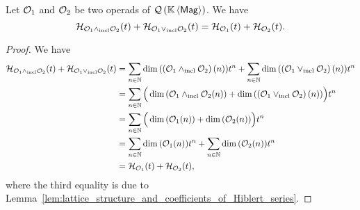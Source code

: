 \begin{Theorem}
    \label{thm:Grassmann_formula_for_Hilbert_series_of_QMag}
    Let $\mathcal{O}_1$ and $\mathcal{O}_2$ be two operads of $\mathcal{Q}\left(\mathbb{K} \left\langle\mathsf{Mag}\right\rangle\right)$. We have
    \begin{equation} \label{equ:lattice_structure_and_Hiblert_series}
        \mathcal{H}_{\mathcal{O}_1\wedge_{\mathrm{incl}}\mathcal{O}_2}(t)
        +\mathcal{H}_{\mathcal{O}_1\vee_{\mathrm{incl}}\mathcal{O}_2}(t)
        =\mathcal{H}_{\mathcal{O}_1}(t)+\mathcal{H}_{\mathcal{O}_2}(t).
    \end{equation}
\end{Theorem}
\begin{proof}
    We have
    \begin{equation}\begin{split}
        \mathcal{H}_{\mathcal{O}_1\wedge_{\mathrm{incl}}\mathcal{O}_2}(t)
        +\mathcal{H}_{\mathcal{O}_1\vee_{\mathrm{incl}}\mathcal{O}_2}(t)&
        =\sum_{n\in\mathbb{N}}\dim{\left(\left(\mathcal{O}_1\wedge_{\mathrm{incl}}\mathcal{O}_2\right)(n)
            \right)}t^n
            +\sum_{n\in\mathbb{N}}\dim{\left(\left(\mathcal{O}_1\vee_{\mathrm{incl}}\mathcal{O}_2\right)
            (n)\right)}t^n\\
        &=\sum_{n\in\mathbb{N}}\Big(\dim{\left(\mathcal{O}_1\wedge_{\mathrm{incl}}\mathcal{O}_2(n)\right)}
            +\dim{\left(\left(\mathcal{O}_1\vee_{\mathrm{incl}}\mathcal{O}_2\right)(n)
        \right)}\Big)t^n\\
        &=\sum_{n\in\mathbb{N}}\Big(\dim{\left(\mathcal{O}_1(n)\right)}
            +\dim{\left(\mathcal{O}_2(n)\right)}\Big)t^n\\
        &=\sum_{n\in\mathbb{N}}\dim{\left(\mathcal{O}_1(n)\right)}t^n+\sum_{n\in\mathbb{N}}
            \dim{\left(\mathcal{O}_2(n)\right)}t^n\\
        &=\mathcal{H}_{\mathcal{O}_1}(t)+\mathcal{H}_{\mathcal{O}_2}(t),
    \end{split}\end{equation}
    where the third equality is due to
    Lemma~\ref{lem:lattice_structure_and_coefficients_of_Hiblert_series}.
\end{proof}
\medbreak

